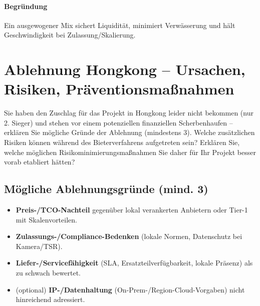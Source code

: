 \documentclass[
%
ngerman %
%
numeric %
]{wbh-assignment}
\begin{document}
\paragraph{Begründung}
Ein ausgewogener Mix sichert Liquidität, minimiert Verwässerung und hält Geschwindigkeit bei Zulassung/Skalierung.

\clearpage

\section{Ablehnung Hongkong – Ursachen, Risiken, Präventionsmaßnahmen}
\label{sec:hongkong_risiken}

\begin{aufgabenstellung}
Sie haben den Zuschlag für das Projekt in Hongkong leider nicht bekommen (nur 2. Sieger) und stehen vor einem potenziellen finanziellen Scherbenhaufen – erklären Sie mögliche Gründe der Ablehnung (mindestens 3). Welche zusätzlichen Risiken können während des Bieterverfahrens aufgetreten sein? Erklären Sie, welche möglichen Risikominimierungsmaßnahmen Sie daher für Ihr Projekt besser vorab etabliert hätten?
\end{aufgabenstellung}

\vspace*{5mm}

\subsection{Mögliche Ablehnungsgründe (mind. 3)}
\begin{itemize}
  \item \textbf{Preis-/TCO-Nachteil} gegenüber lokal verankerten Anbietern oder Tier-1 mit Skalenvorteilen.
  \item \textbf{Zulassungs-/Compliance-Bedenken} (lokale Normen, Datenschutz bei Kamera/TSR).
  \item \textbf{Liefer-/Servicefähigkeit} (SLA, Ersatzteilverfügbarkeit, lokale Präsenz) als zu schwach bewertet.
  \item (optional) \textbf{IP-/Datenhaltung} (On-Prem-/Region-Cloud-Vorgaben) nicht hinreichend adressiert.
\end{itemize}
\end{document}
